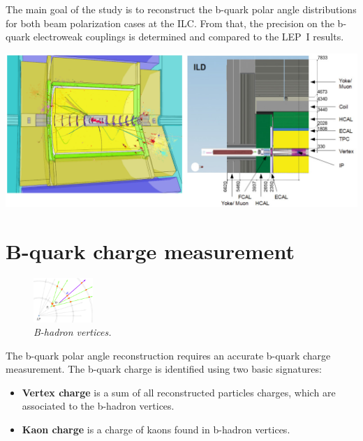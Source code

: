 The main goal of the study is to reconstruct the b-quark polar angle distributions for both beam polarization cases at the ILC. 
From that, the precision on the b-quark electroweak couplings is determined and compared to the LEP~I results. 
\begin{center}\vspace{1cm}
	\centering
	
	\includegraphics[width=0.9\linewidth]{figures/ild2.png}
	\label{fig:ILDScheme}
\end{center}\vspace{1cm}

\color{DarkSlateGray} %

\section*{B-quark charge measurement}
\setlength{\columnsep}{20pt}%
\begin{figure}
	
	\includegraphics[width=0.2\textwidth]{figures/vtx.pdf}
	\caption{\sl B-hadron vertices.}
	\label{fig:vtx}

\end{figure}

\color{Blue}
The b-quark polar angle reconstruction requires an accurate b-quark charge measurement. 
The b-quark charge is identified using two basic signatures:
\begin{itemize}
	\item \textbf{Vertex charge} is a sum of all reconstructed particles charges, which are associated to the b-hadron vertices. 
	\item \textbf{Kaon charge} is a charge of kaons found in b-hadron vertices. 
\end{itemize}

